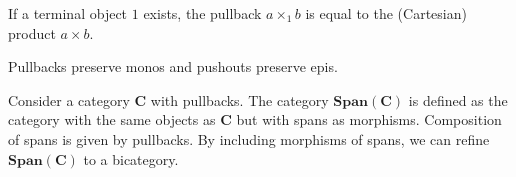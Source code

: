     \begin{property}[Product]
        If a terminal object $1$ exists, the pullback $a\times_1b$ is equal to the (Cartesian) product $a\times b$.
    \end{property}


    \begin{property}
        Pullbacks preserve monos and pushouts preserve epis.
    \end{property}

    \begin{property}\label{cat:span_category}
        Consider a category $\mathbf{C}$ with pullbacks. The category $\mathbf{Span}(\mathbf{C})$ is defined as the category with the same objects as $\mathbf{C}$ but with spans as morphisms. Composition of spans is given by pullbacks. By including morphisms of spans, we can refine $\mathbf{Span}(\mathbf{C})$ to a bicategory.
    \end{property}

